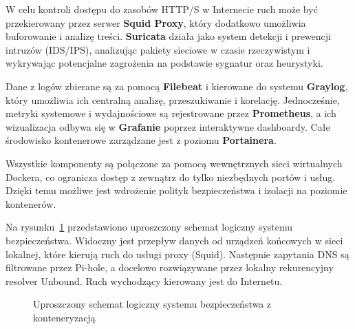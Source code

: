 \documentclass[
    left=2.5cm,         %
    right=2.5cm,        %
    top=2.5cm,          %
    bottom=3cm,         %
    bindingoffset=6mm,  %
    nohyphenation=true %
]{eiti/eiti-thesis} %
\begin{document}
W celu kontroli dostępu do zasobów HTTP/S w Internecie ruch może być przekierowany przez serwer \textbf{Squid Proxy}, który dodatkowo umożliwia buforowanie i analizę treści. \textbf{Suricata} działa jako system detekcji i prewencji intruzów (IDS/IPS), analizując pakiety sieciowe w czasie rzeczywistym i wykrywając potencjalne zagrożenia na podstawie sygnatur oraz heurystyki.

Dane z logów zbierane są za pomocą \textbf{Filebeat} i kierowane do systemu \textbf{Graylog}, który umożliwia ich centralną analizę, przeszukiwanie i korelację. Jednocześnie, metryki systemowe i wydajnościowe są rejestrowane przez \textbf{Prometheus}, a ich wizualizacja odbywa się w \textbf{Grafanie} poprzez interaktywne dashboardy. Całe środowisko kontenerowe zarządzane jest z poziomu \textbf{Portainera}.

Wszystkie komponenty są połączone za pomocą wewnętrznych sieci wirtualnych Dockera, co ogranicza dostęp z zewnątrz do tylko niezbędnych portów i usług. Dzięki temu możliwe jest wdrożenie polityk bezpieczeństwa i izolacji na poziomie kontenerów. 

Na rysunku~\ref{fig:architektura} przedstawiono uproszczony schemat logiczny systemu bezpieczeństwa. Widoczny jest przepływ danych od urządzeń końcowych w sieci lokalnej, które kierują ruch do usługi proxy (Squid). Następnie zapytania DNS są filtrowane przez Pi-hole, a docelowo rozwiązywane przez lokalny rekurencyjny resolver Unbound. Ruch wychodzący kierowany jest do Internetu. 

\begin{figure}[H]
\centering
{}
\caption{Uproszczony schemat logiczny systemu bezpieczeństwa z konteneryzacją}
\label{fig:architektura}
\end{figure}
\end{document}
